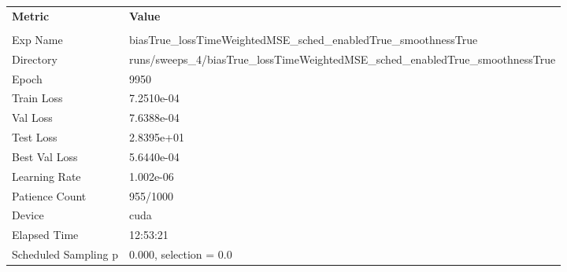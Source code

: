 \begin{tabular}{|l|l|}
\hline
\textbf{Metric} & \textbf{Value} \\\\
Exp Name & biasTrue_lossTimeWeightedMSE_sched_enabledTrue_smoothnessTrue \\ 
Directory & runs/sweeps_4/biasTrue_lossTimeWeightedMSE_sched_enabledTrue_smoothnessTrue \\ 
Epoch & 9950 \\ 
Train Loss & 7.2510e-04 \\ 
Val Loss & 7.6388e-04 \\ 
Test Loss & 2.8395e+01 \\ 
Best Val Loss & 5.6440e-04 \\ 
Learning Rate & 1.002e-06 \\ 
Patience Count & 955/1000 \\ 
Device & cuda \\ 
Elapsed Time & 12:53:21 \\ 
Scheduled Sampling p & 0.000, selection = 0.0 \\ 
\hline
\end{tabular}